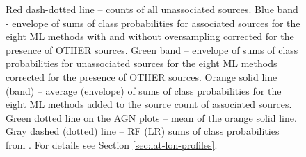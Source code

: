 \documentclass{aa}
\begin{document}
\begin{figure}[h]
{Red dash-dotted line -- counts of all unassociated sources. 
Blue band - envelope of sums of class probabilities for associated sources for the eight ML methods with and without oversampling
corrected for the presence of OTHER sources.
Green band -- envelope of sums of class probabilities for unassociated sources for the eight ML methods corrected for the presence of OTHER sources. 
Orange solid line (band) -- average (envelope) of sums of class probabilities for the eight ML methods added to the source count of associated sources. 
Green dotted line on the AGN plots -- mean of the orange solid line.
Gray dashed (dotted) line -- RF (LR) sums of class probabilities from \cite{2016ApJ...820....8S}.
For details see Section \ref{sec:lat-lon-profiles}. }  
\label{fig:lat_profile}
\end{figure}
\end{document}
